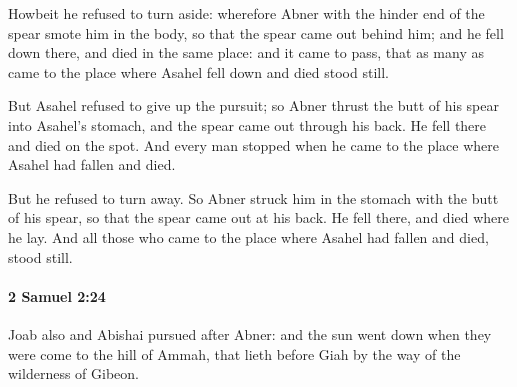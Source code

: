 			\begin{versebox}
					\item[BHS] 
					\item[ASV] Howbeit he refused to turn aside: wherefore Abner with the hinder end of the spear smote him in the body, so that the spear came out behind him; and he fell down there, and died in the same place: and it came to pass, that as many as came to the place where Asahel fell down and died stood still.
					\item[NIV] But Asahel refused to give up the pursuit; so Abner thrust the butt of his spear into Asahel’s stomach, and the spear came out through his back. He fell there and died on the spot. And every man stopped when he came to the place where Asahel had fallen and died.
					\item[NRSV] But he refused to turn away. So Abner struck him in the stomach with the butt of his spear, so that the spear came out at his back. He fell there, and died where he lay. And all those who came to the place where Asahel had fallen and died, stood still.
			\end{versebox}

		\paragraph{2 Samuel 2:24} %
			\label{2SAMUEL-2-24}

			Joab also and Abishai pursued after Abner: and the sun went down when they were come to the hill of Ammah, that lieth before Giah by the way of the wilderness of Gibeon.

